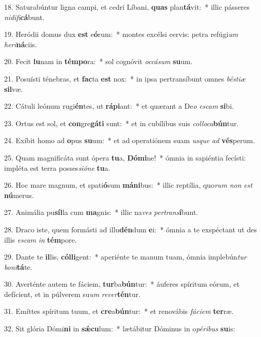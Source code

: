 18. Saturabúntur ligna campi, et cedri Líbani, \textbf{quas} plan\textbf{tá}vit:~*  illic pásseres \textit{ni}\textit{di}\textit{fi}\textbf{cá}bunt.\

19. Heródii domus dux \textbf{est} e\textbf{ó}rum:~*  montes excélsi cervis: petra refúgi\textit{um} \textit{he}\textit{ri}\textbf{ná}ciis.\

20. Fecit \textbf{lu}nam in \textbf{tém}\textbf{po}ra:~*  sol cognóvit \textit{oc}\textit{cá}\textit{sum} \textbf{su}um.\

21. Posuísti ténebras, et \textbf{fac}ta \textbf{est} nox:~*  in ipsa pertransíbunt omnes \textit{bés}\textit{ti}\textit{æ} \textbf{sil}væ.\

22. Cátuli leónum rugi\textbf{én}tes, ut \textbf{rá}\textbf{pi}ant:~*  et quærant a De\textit{o} \textit{es}\textit{cam} \textbf{si}bi.\

23. Ortus est sol, et \textbf{con}gre\textbf{gá}\textbf{ti} sunt:~*  et in cubílibus suis \textit{col}\textit{lo}\textit{ca}\textbf{bún}tur.\

24. Exíbit homo ad \textbf{o}pus \textbf{su}um:~*  et ad operatiónem suam \textit{us}\textit{que} \textit{ad} \textbf{vés}perum.\

25. Quam magnificáta sunt ópera \textbf{tu}a, \textbf{Dó}\textbf{mi}ne!~*  ómnia in sapiéntia fecísti: impléta est terra posses\textit{si}\textit{ó}\textit{ne} \textbf{tu}a.\

26. Hoc mare magnum, et spati\textbf{ó}sum \textbf{má}\textbf{ni}bus:~*  illic reptília, quo\textit{rum} \textit{non} \textit{est} \textbf{nú}merus.\

27. Animália pu\textbf{síl}la cum \textbf{ma}gnis:~*  illic na\textit{ves} \textit{per}\textit{trans}\textbf{í}bunt.\

28. Draco iste, quem formásti ad illu\textbf{dén}dum \textbf{e}i:~*  ómnia a te exspéctant ut des illis \textit{es}\textit{cam} \textit{in} \textbf{tém}pore.\

29. Dante te \textbf{il}lis, \textbf{cól}\textbf{li}gent:~*  aperiénte te manum tuam, ómnia implebún\textit{tur} \textit{bo}\textit{ni}\textbf{tá}te.\

30. Averténte autem te fáciem, \textbf{tur}ba\textbf{bún}tur:~*  áuferes spíritum eórum, et defícient, et in púlverem su\textit{um} \textit{re}\textit{ver}\textbf{tén}tur.\

31. Emíttes spíritum tuum, et \textbf{cre}a\textbf{bún}tur:~*  et renovábis \textit{fá}\textit{ci}\textit{em} \textbf{ter}ræ.\

32. Sit glória Dómi\textbf{ni} in \textbf{sǽ}\textbf{cu}lum:~*  lætábitur Dóminus in o\textit{pé}\textit{ri}\textit{bus} \textbf{su}is:\


